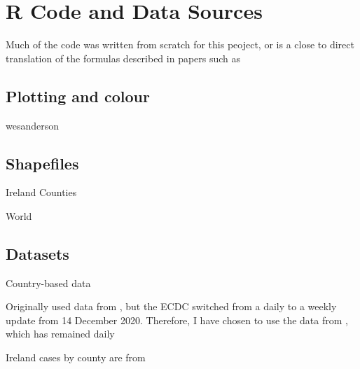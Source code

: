 \section{R Code and Data Sources}
\label{ch:codesource}

Much of the code was written from scratch for this peoject, or is a close to direct translation of the formulas described in papers such as %

\subsection{Plotting and colour}

wesanderson \cite{wesanderson20}

\subsection{Shapefiles}

Ireland Counties \cite{countyshape}

World \cite{countryshape}

\subsection{Datasets}

Country-based data 

Originally used data from \cite{ecdcdata},  but the ECDC switched from a daily to a weekly update from 14 December 2020. Therefore, I have chosen to use the data from  \cite{countrydata}, which has remained daily

Ireland cases by county are from \cite{irelanddata}